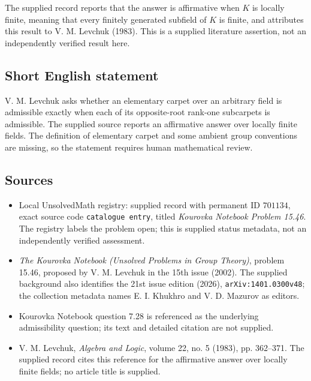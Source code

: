 \documentclass[11pt]{article}
\begin{document}
The supplied record reports that the answer is affirmative when \(K\) is locally finite, meaning that every finitely generated subfield of \(K\) is finite, and attributes this result to V. M. Levchuk (1983). This is a supplied literature assertion, not an independently verified result here.
\subsection{Short English statement}
V. M. Levchuk asks whether an elementary carpet over an arbitrary field is admissible exactly when each of its opposite-root rank-one subcarpets is admissible. The supplied source reports an affirmative answer over locally finite fields. The definition of elementary carpet and some ambient group conventions are missing, so the statement requires human mathematical review.
\subsection{Sources}
\begin{itemize}
\item Local UnsolvedMath registry: supplied record with permanent ID \(701134\), exact source code \texttt{catalogue entry}, titled \emph{Kourovka Notebook Problem 15.46}. The registry labels the problem open; this is supplied status metadata, not an independently verified assessment.
\item \emph{The Kourovka Notebook (Unsolved Problems in Group Theory)}, problem 15.46, proposed by V. M. Levchuk in the 15th issue (2002). The supplied background also identifies the 21st issue edition (2026), \texttt{arXiv:1401.0300v48}; the collection metadata names E. I. Khukhro and V. D. Mazurov as editors.
\item Kourovka Notebook question 7.28 is referenced as the underlying admissibility question; its text and detailed citation are not supplied.
\item V. M. Levchuk, \emph{Algebra and Logic}, volume 22, no. 5 (1983), pp. 362--371. The supplied record cites this reference for the affirmative answer over locally finite fields; no article title is supplied.
\end{itemize}
\end{document}

